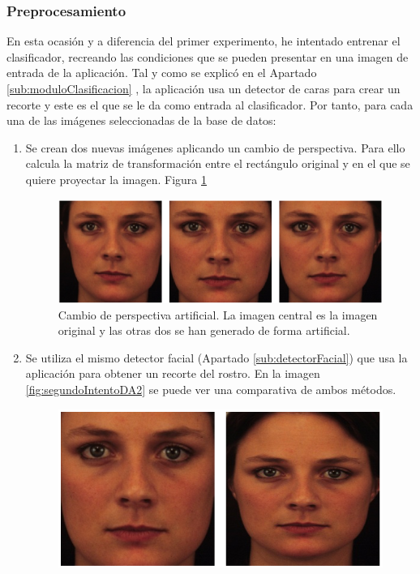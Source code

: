 \documentclass[a4paper,11pt]{book}
\begin{document}
\subsubsection{Preprocesamiento}
En esta ocasión y a diferencia del primer experimento, he intentado entrenar el clasificador, recreando las condiciones que se pueden presentar en una imagen de entrada de la aplicación. Tal y como se explicó en el Apartado \ref{sub:moduloClasificacion} , la aplicación usa un detector de caras para crear un recorte y este es el que se le da como entrada al clasificador. Por tanto, para cada una de las imágenes seleccionadas de la base de datos:
\begin{enumerate}
	\item Se crean dos nuevas imágenes aplicando un cambio de perspectiva. Para ello calcula la matriz de transformación entre el rectángulo original y en el que se quiere proyectar la imagen. Figura \ref{fig:segundoIntentoDA1}
		\begin{figure}[h]
		\centering
		\includegraphics[width=0.9\linewidth]{imagenes/segundoIntentoDA1}
		\caption[Experimento 2 Cambio de Perspectiva]{Cambio de perspectiva artificial. La imagen central es la imagen original y las otras dos se han generado de forma artificial.}
		\label{fig:segundoIntentoDA1}
		\end{figure} 
	\item Se utiliza el mismo detector facial (Apartado \ref{sub:detectorFacial}) que usa la aplicación para obtener un recorte del rostro. En la imagen \ref{fig:segundoIntentoDA2} se puede ver una comparativa de ambos métodos.
		\begin{figure}[h]
			\centering
			\includegraphics[width=0.7\linewidth]{imagenes/segundoIntentoDA2}

\end{figure}
\end{enumerate}
\end{document}
